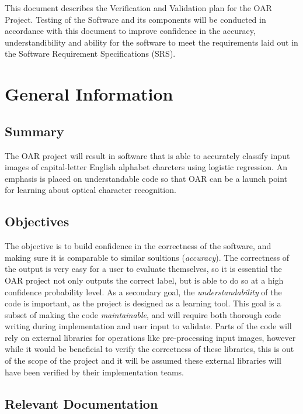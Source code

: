 \documentclass[12pt, titlepage]{article}
\begin{document}
\newpage


This document describes the Verification and Validation plan for the OAR Project. Testing of the Software and its components
will be conducted in accordance with this document to improve confidence in the accuracy, understandibility and ability for the software 
to meet the requirements laid out in the Software Requirement Specifications (SRS).

\section{General Information}

\subsection{Summary}

The OAR project will result in software that is able to accurately classify input images of capital-letter English alphabet charcters using
logistic regression. An emphasis is placed on understandable code so that OAR can be a launch point for learning about optical
character recognition.

\subsection{Objectives}

The objective is to build confidence in the correctness of the software, and making sure it is comparable
to similar soultions (\textit{accuracy}). The correctness of the output is very easy for a user to evaluate themselves, so
it is essential the OAR project not only outputs the correct label, but is able to do so at a high confidence probability level.  
As a secondary goal, the \textit{understandability} of the code is important, as the project is designed as a learning tool.
This goal is a subset of making the code \textit{maintainable}, and will require both thorough code writing during implementation
and user input to validate. Parts of the code will rely on external libraries for operations like pre-processing input images,
however while it would be beneficial to verify the correctness of these libraries, this is out of the scope of the project and it will 
be assumed these external libraries will have been verified by their implementation teams.

\subsection{Relevant Documentation}
\end{document}
